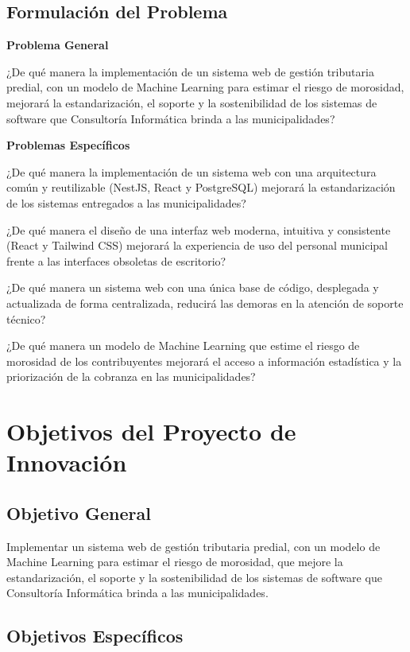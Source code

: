 \documentclass[12pt,a4paper]{report}
\begin{document}
\subsection{Formulación del Problema}

\textbf{Problema General}

\medskip
¿De qué manera la implementación de un sistema web de gestión tributaria predial, con un modelo de Machine Learning para estimar el riesgo de morosidad, mejorará la estandarización, el soporte y la sostenibilidad de los sistemas de software que Consultoría Informática brinda a las municipalidades?

\bigskip
\textbf{Problemas Específicos}

\medskip
¿De qué manera la implementación de un sistema web con una arquitectura común y reutilizable (NestJS, React y PostgreSQL) mejorará la estandarización de los sistemas entregados a las municipalidades?

\medskip
¿De qué manera el diseño de una interfaz web moderna, intuitiva y consistente (React y Tailwind CSS) mejorará la experiencia de uso del personal municipal frente a las interfaces obsoletas de escritorio?

\medskip
¿De qué manera un sistema web con una única base de código, desplegada y actualizada de forma centralizada, reducirá las demoras en la atención de soporte técnico?

\medskip
¿De qué manera un modelo de Machine Learning que estime el riesgo de morosidad de los contribuyentes mejorará el acceso a información estadística y la priorización de la cobranza en las municipalidades?

\section{Objetivos del Proyecto de Innovación}

\subsection{Objetivo General}

Implementar un sistema web de gestión tributaria predial, con un modelo de Machine Learning para estimar el riesgo de morosidad, que mejore la estandarización, el soporte y la sostenibilidad de los sistemas de software que Consultoría Informática brinda a las municipalidades.

\subsection{Objetivos Específicos}
\end{document}
